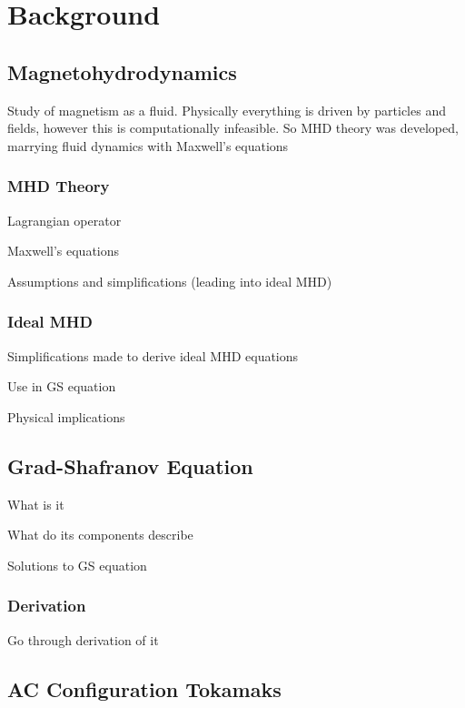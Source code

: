 
\chapter{Background}
\label{chapter2}

\section{Magnetohydrodynamics}

Study of magnetism as a fluid. Physically everything is driven by 
particles and fields, however this is computationally infeasible. So MHD 
theory was developed, marrying fluid dynamics with Maxwell's equations

\subsection{MHD Theory}

Lagrangian operator

Maxwell's equations

Assumptions and simplifications (leading into ideal MHD)

\subsection{Ideal MHD}

Simplifications made to derive ideal MHD equations 

Use in GS equation 

Physical implications

\section{Grad-Shafranov Equation}

What is it

What do its components describe

Solutions to GS equation 

\subsection{Derivation}

Go through derivation of it 

\section{AC Configuration Tokamaks}

